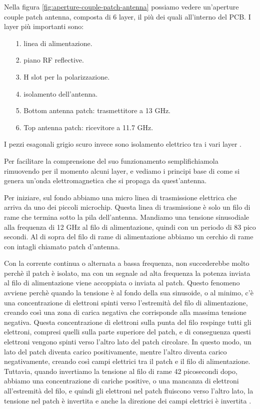 Nella figura \ref{fig:aperture-couple-patch-antenna} possiamo vedere un'aperture couple patch antenna, composta di 6 layer, il più dei quali all'interno del PCB.
I layer più importanti sono:
\begin{itemize}
  \item[1.] linea di alimentazione.
  \item[2.] piano RF reflective.
  \item[3.] H slot per la polarizzazione.
  \item[4.] isolamento dell'antenna.
  \item[5.] Bottom antenna patch: trasmettitore a 13 GHz.
  \item[6.] Top antenna patch: ricevitore a 11.7 GHz.
\end{itemize}
I pezzi esagonali grigio scuro invece sono isolamento elettrico tra i vari layer \cite{branch_education_how_2022}.

Per facilitare la comprensione del suo funzionamento semplifichiamola rimuovendo per il momento alcuni layer, e vediamo i principi base di come si genera un'onda elettromagnetica che si propaga da quest'antenna.

Per iniziare, sul fondo abbiamo una micro linea di trasmissione elettrica che arriva da uno dei piccoli microchip.
Questa linea di trasmissione è solo un filo di rame che termina sotto la pila dell'antenna.
Mandiamo una tensione sinusodiale alla frequenza di 12 GHz al filo di alimentazione, quindi con un periodo di 83 pico secondi.
Al di sopra del filo di rame di alimentazione abbiamo un cerchio di rame con intagli chiamato patch d'antenna.

Con la corrente continua o alternata a bassa frequenza, non succederebbe molto perchè il patch è isolato, ma con un segnale ad alta frequenza la potenza inviata al filo di alimentazione viene accoppiata o inviata al patch.
Questo fenomeno avviene perchè quando la tensione è al fondo della sua sinusoide, o al minimo, c'è una concentrazione di elettroni spinti verso l'estremità del filo di alimentazione, creando così una zona di carica negativa che corrisponde alla massima tensione negativa.
Questa concentrazione di elettroni sulla punta del filo respinge tutti gli elettroni, compresi quelli sulla parte superiore del patch, e di conseguenza questi elettroni vengono spinti verso l'altro lato del patch circolare.
In questo modo, un lato del patch diventa carico positivamente, mentre l'altro diventa carico negativamente, creando così campi elettrici tra il patch e il filo di alimentazione.
Tuttavia, quando invertiamo la tensione al filo di rame 42 picosecondi dopo, abbiamo una concentrazione di cariche positive, o una mancanza di elettroni all'estremità del filo, e quindi gli elettroni nel patch fluiscono verso l'altro lato, la tensione nel patch è invertita e anche la direzione dei campi elettrici è invertita \cite{branch_education_how_2022}.

